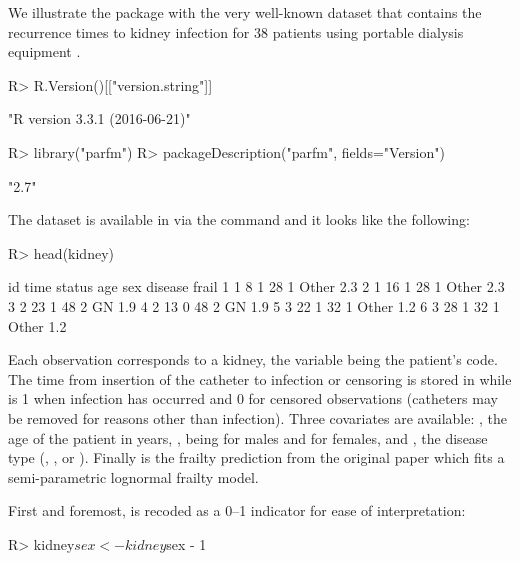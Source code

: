 We illustrate the  package with the very well-known  dataset 
  that contains the recurrence times to kidney infection for 38 patients using portable dialysis equipment \citep{McGilchristAisbett91}.
\begin{CodeChunk}
\begin{CodeInput}
R> R.Version()[["version.string"]]
\end{CodeInput}
\begin{CodeOutput}
[1] "R version 3.3.1 (2016-06-21)"
\end{CodeOutput}
\begin{CodeInput}
R> library("parfm")
R> packageDescription("parfm", fields="Version")
\end{CodeInput}
\begin{CodeOutput}
[1] "2.7"
\end{CodeOutput}
\end{CodeChunk}
The dataset is available in  via the command  and it looks like the following:
\begin{CodeChunk}
\begin{CodeInput}
R> head(kidney)
\end{CodeInput}
\begin{CodeOutput}
  id time status age sex disease frail
1  1    8      1  28   1   Other   2.3
2  1   16      1  28   1   Other   2.3
3  2   23      1  48   2      GN   1.9
4  2   13      0  48   2      GN   1.9
5  3   22      1  32   1   Other   1.2
6  3   28      1  32   1   Other   1.2
\end{CodeOutput}
\end{CodeChunk}

Each observation corresponds to a kidney, 
  the variable  being the patient's code.
The time from insertion of the catheter to infection or censoring is stored in 
  while  is 1 when infection has occurred and 0 for censored observations (catheters may be removed for reasons other than infection).
Three covariates are available: , the age of the patient in years,
  , being  for males and  for females,
  and , the disease type
  (, ,  or ).
Finally  is the frailty prediction from the original paper which fits a semi-parametric lognormal frailty model.

First and foremost,  is recoded as a 0--1 indicator for ease of interpretation:
\begin{CodeChunk}
\begin{CodeInput}
R> kidney$sex <- kidney$sex - 1
\end{CodeInput}
\end{CodeChunk}


